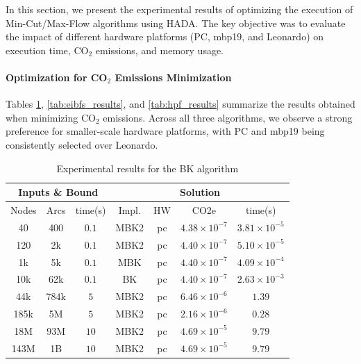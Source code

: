 \documentclass[a4paper,singleside,12pt]{report} %
\begin{document}
In this section, we present the experimental results of optimizing the execution of Min-Cut/Max-Flow algorithms using HADA. The key objective was to evaluate the impact of different
hardware platforms (PC, mbp19, and Leonardo) on execution time, CO$_2$ emissions, and memory usage.

\paragraph{Optimization for CO$_2$ Emissions Minimization}

Tables \ref{tab:bk_results}, \ref{tab:eibfs_results}, and \ref{tab:hpf_results} summarize the results obtained when minimizing CO$_2$ emissions. Across all three algorithms, we observe
a strong preference for smaller-scale hardware platforms, with PC and mbp19 being consistently selected over Leonardo.

\begin{table}[h!]
    \centering
    \begin{tabular}{|ccc|cccc|}
        \hline
        \multicolumn{3}{|c|}{Inputs \& Bound} & \multicolumn{4}{c|}{Solution} \\
        \hline
        Nodes & Arcs & time(s) & Impl. & HW & CO2e & time(s) \\
        \hline
        40 & 400 & $0.1$ & MBK2 & pc & $4.38 \times 10^{-7}$ & $3.81 \times 10^{-5}$ \\
        120 & 2k & $0.1$ & MBK2 & pc & $4.40 \times 10^{-7}$ & $5.10 \times 10^{-5}$ \\
        1k & 5k & $0.1$ & MBK & pc & $4.40 \times 10^{-7}$ & $4.09 \times 10^{-4}$ \\
        10k & 62k & $0.1$ & BK & pc & $4.40 \times 10^{-7}$ & $2.63 \times 10^{-3}$ \\
        44k & 784k & $5$ & MBK2 & pc & $6.46 \times 10^{-6}$ & $1.39$ \\
        185k & 5M & $5$ & MBK2 & pc & $2.16 \times 10^{-6}$ & $0.28$ \\
        18M & 93M & $10$ & MBK2 & pc & $4.69 \times 10^{-5}$& $9.79$ \\
        143M & 1B & $10$ & MBK2 & pc & $4.69 \times 10^{-5}$ & $9.79$ \\
        \hline
    \end{tabular}
    \caption{Experimental results for the BK algorithm}
    \label{tab:bk_results}
\end{table}
\end{document}
